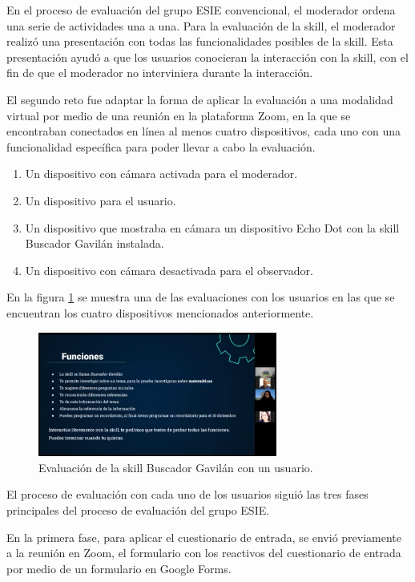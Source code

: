 En el proceso de evaluación del grupo ESIE convencional, el moderador ordena una serie de actividades una a una. Para la evaluación de la skill, el moderador realizó una presentación con todas las funcionalidades posibles de la skill. Esta presentación ayudó a que los usuarios conocieran la interacción con la skill, con el fin de que el moderador no interviniera durante la interacción.

El segundo reto fue adaptar la forma de aplicar la evaluación a una modalidad virtual por medio de una reunión en la plataforma Zoom, en la que se encontraban conectados en línea al menos cuatro dispositivos, cada uno con una funcionalidad específica para poder llevar a cabo la evaluación.

\begin{enumerate}
  \item Un dispositivo con cámara activada para el moderador.
  \item Un dispositivo para el usuario.
  \item Un dispositivo que mostraba en cámara un dispositivo Echo Dot con la skill Buscador Gavilán instalada.
  \item Un dispositivo con cámara desactivada para el observador.
\end{enumerate}

En la figura \ref{fig:424} se muestra una de las evaluaciones con los usuarios en las que se encuentran los cuatro dispositivos mencionados anteriormente.

\begin{figure}
  \centering
  \includegraphics[width=0.70\textwidth]{Cap4/Figuras/Pruebas usuario 1.png}
  \caption{Evaluación de la skill Buscador Gavilán con un usuario.}
  \label{fig:424}
\end{figure}

El proceso de evaluación con cada uno de los usuarios siguió las tres fases principales del proceso de evaluación del grupo ESIE.

En la primera fase, para aplicar el cuestionario de entrada, se envió previamente a la reunión en Zoom, el formulario con los reactivos del cuestionario de entrada por medio de un formulario en Google Forms.

